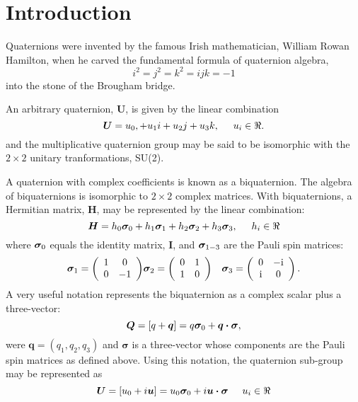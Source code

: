 \documentclass[12pt]{article}
\newcommand{\Ci}{{\rm i}}
\newcommand\pauli[1]{\ensuremath{ \bm{\sigma}_{\rm #1} }}
\begin{document}
\section{Introduction}

Quaternions were invented by the famous Irish mathematician, William
Rowan Hamilton, when he carved the fundamental formula of quaternion
algebra,
\begin{equation}
i^2=j^2=k^2=ijk=-1
\end{equation}
into the stone of the Brougham bridge.

An arbitrary quaternion, $\bm{U}$, is given by the linear combination
\begin{equation}
\bm{U}=u_0,+u_1i+u_2j+u_3k, \hspace{5mm} u_i\in\Re. 
\end{equation}
and the multiplicative quaternion group may be said to be isomorphic with
the $2\times2$ unitary tranformations, SU(2).

A quaternion with complex coefficients is known as a biquaternion.
The algebra of biquaternions is isomorphic to $2\times2$ complex
matrices.  With biquaternions, a Hermitian matrix, $\bm{H}$, may be 
represented by the linear combination:
\begin{equation}
\bm{H}=h_0\pauli{0} + h_1\pauli{1}
	+ h_2\pauli{2} + h_3\pauli{3}, \hspace{5mm} h_i\in\Re
\end{equation}
where $\pauli{0}$ equals the identity matrix, $\bm{I}$, and $\pauli{1-3}$
are the Pauli spin matrices:
\begin{eqnarray}
\pauli{1} = \left( \begin{array}{cc}
1 & 0 \\
0 & -1 
\end{array}\right)
&
\pauli{2} = \left( \begin{array}{cc}
0 & 1 \\
1 & 0 
\end{array}\right)
& 
\pauli{3} = \left( \begin{array}{cc}
0 & -\Ci \\
\Ci & 0
\end{array}\right).
\label{pauli}
\end{eqnarray}
A very useful notation represents the biquaternion as a complex scalar plus
a three-vector:
\begin{equation}
\bm{Q}=[q+\bm{q}] = q\pauli{0} + \bm{q\cdot\sigma},
\end{equation}
were $\bm{q}=(q_1,q_2,q_3)$ and $\bm\sigma$ is a three-vector whose
components are the Pauli spin matrices as defined above.
Using this notation, the quaternion sub-group may be represented as
\begin{equation}
\bm{U}=[u_0+i\bm{u}]= u_0\pauli{0} + i\bm{u\cdot\sigma} \hspace{5mm} u_i\in\Re
\end{equation}
\end{document}
